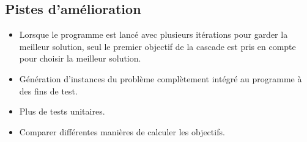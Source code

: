 \documentclass[11pt]{article}
\begin{document}
\subsection{Pistes d'amélioration}
\begin{itemize}
    \item Lorsque le programme est lancé avec plusieurs itérations pour garder la meilleur solution, seul le premier objectif de la cascade est pris en compte pour choisir la meilleur solution.
    \item Génération d'instances du problème complètement intégré au programme à des fins de test.
    \item Plus de tests unitaires.
    \item Comparer différentes manières de calculer les objectifs.
\end{itemize}
\end{document}
